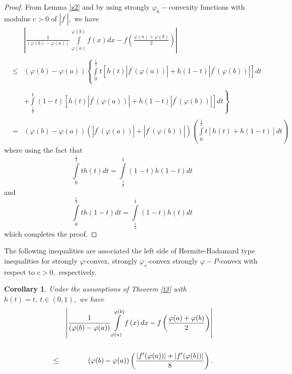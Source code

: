 \documentclass{amsart}
\theoremstyle{plain}
\newtheorem{corollary}{Corollary}
\numberwithin{equation}{section}
\begin{document}
\begin{proof}
From Lemma \ref{z2} and by using strongly $\varphi _{h}-$convexity functions
with modulus $c>0$ of $\left\vert f^{\prime }\right\vert ,$ we have\begin{eqnarray*}
&&\left\vert \frac{1}{(\varphi (b)-\varphi (a))}\int\limits_{\varphi
(a)}^{\varphi (b)}f\left( x\right) dx-f\left( \frac{\varphi (a)+\varphi (b)}{2}\right) \right\vert  \\
&& \\
&\leq &(\varphi (b)-\varphi (a))\left\{ \int\limits_{0}^{\frac{1}{2}}t\left[
h(t)\left\vert f^{\prime }(\varphi (a))\right\vert +h(1-t)\left\vert
f^{\prime }(\varphi (b))\right\vert \right] dt\right.  \\
&& \\
&&+\left. \int\limits_{\frac{1}{2}}^{1}\left( 1-t\right) \left[
h(t)\left\vert f^{\prime }(\varphi (a))\right\vert +h(1-t)\left\vert
f^{\prime }(\varphi (b))\right\vert \right] dt\right\}  \\
&& \\
&=&(\varphi (b)-\varphi (a))\left( \left\vert f^{\prime }(\varphi
(a))\right\vert +\left\vert f^{\prime }(\varphi (b))\right\vert \right)
\left( \int\limits_{0}^{\frac{1}{2}}t\left[ h(t)+h(1-t)\right] dt\right) 
\end{eqnarray*}where using the fact that\begin{equation*}
\int\limits_{0}^{\frac{1}{2}}th(t)dt=\int\limits_{\frac{1}{2}}^{1}\left(
1-t\right) h(1-t)dt
\end{equation*}and\begin{equation*}
\int\limits_{0}^{\frac{1}{2}}th(1-t)dt=\int\limits_{\frac{1}{2}}^{1}\left(
1-t\right) h(t)dt
\end{equation*}which completes the proof.
\end{proof}

The following inequalities are associated the left side of Hermite-Hadamard
type inequalities for strongly $\varphi $-convex, strongly $\varphi _{s}$-convex strongly $\varphi -P$-convex with respect to $c>0,$ respectively.

\begin{corollary}
Under the assumptions of Theorem \ref{t3} with $h(t)=t,\ t\in \left(
0,1\right) ,$ we have\begin{eqnarray}
&&\left\vert \frac{1}{(\varphi (b)-\varphi (a))}\int\limits_{\varphi
(a)}^{\varphi (b)}f\left( x\right) dx-f\left( \frac{\varphi (a)+\varphi (b)}{2}\right) \right\vert   \notag \\
&&  \label{c4} \\
&\leq &(\varphi (b)-\varphi (a))\left( \frac{\left\vert f^{\prime }(\varphi
(a))\right\vert +\left\vert f^{\prime }(\varphi (b))\right\vert }{8}\right) .
\notag
\end{eqnarray}
\end{corollary}
\end{document}
